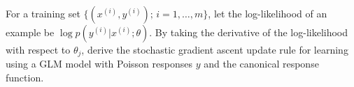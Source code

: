 \clearpage
\item {} For a training set
$\{(x^{(i)}, y^{(i)});\, i=1,\ldots,m\}$, let the log-likelihood of an example
be $\log p(y^{(i)} | x^{(i)}; \theta)$. By taking the derivative of the
log-likelihood with respect to $\theta_j$, derive the stochastic gradient
ascent update rule for learning using a GLM model with Poisson responses $y$
and the canonical response function.

\ifnum{}\fi
